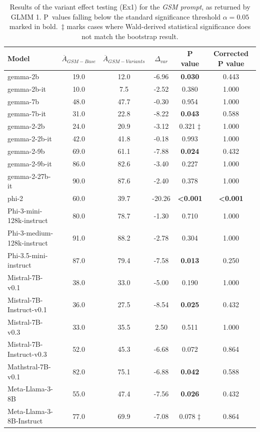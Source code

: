 \documentclass[11pt]{article}
\newcommand{\pbdesc}{P~values falling below the standard significance threshold $\alpha=0.05$ marked in bold.}
\newcommand{\ddagdesc}{$\ddagger$ marks cases where Wald-derived statistical significance does not match the bootstrap result.}
\begin{document}
\begin{table}[H]
\centering
\small
\begin{tabular}{lccccc}
\toprule
Model & $\overline{A}_{GSM-Base}$ & $\overline{A}_{GSM-Variants}$ & $\Delta_{var}$ & P value & Corrected P value \\
\midrule
gemma-2b & 19.0 & 12.0 & -6.96 & \textbf{0.030} & 0.443 \\
gemma-2b-it & 10.0 & 7.5 & -2.52 & 0.380 & 1.000 \\
gemma-7b & 48.0 & 47.7 & -0.30 & 0.954 & 1.000 \\
gemma-7b-it & 31.0 & 22.8 & -8.22 & \textbf{0.043} & 0.588 \\
gemma-2-2b & 24.0 & 20.9 & -3.12 & 0.321 $\ddagger$ & 1.000 \\
gemma-2-2b-it & 42.0 & 41.8 & -0.18 & 0.993 & 1.000 \\
gemma-2-9b & 69.0 & 61.1 & -7.88 & \textbf{0.024} & 0.432 \\
gemma-2-9b-it & 86.0 & 82.6 & -3.40 & 0.227 & 1.000 \\
gemma-2-27b-it & 90.0 & 87.6 & -2.40 & 0.378 & 1.000 \\
phi-2 & 60.0 & 39.7 & -20.26 & \textbf{<0.001} & \textbf{<0.001} \\
Phi-3-mini-128k-instruct & 80.0 & 78.7 & -1.30 & 0.710 & 1.000 \\
Phi-3-medium-128k-instruct & 91.0 & 88.2 & -2.78 & 0.304 & 1.000 \\
Phi-3.5-mini-instruct & 87.0 & 79.4 & -7.58 & \textbf{0.013} & 0.250 \\
Mistral-7B-v0.1 & 38.0 & 33.0 & -5.00 & 0.190 & 1.000 \\
Mistral-7B-Instruct-v0.1 & 36.0 & 27.5 & -8.54 & \textbf{0.025} & 0.432 \\
Mistral-7B-v0.3 & 33.0 & 35.5 & 2.50 & 0.511 & 1.000 \\
Mistral-7B-Instruct-v0.3 & 52.0 & 45.3 & -6.68 & 0.072 & 0.864 \\
Mathstral-7B-v0.1 & 82.0 & 75.1 & -6.88 & \textbf{0.042} & 0.588 \\
Meta-Llama-3-8B & 55.0 & 47.4 & -7.56 & \textbf{0.026} & 0.432 \\
Meta-Llama-3-8B-Instruct & 77.0 & 69.9 & -7.08 & 0.078 $\ddagger$ & 0.864 \\
\bottomrule
\end{tabular}
\caption{Results of the variant effect testing (Ex1) for the \textit{GSM prompt}, as returned by GLMM 1. \pbdesc\ \ddagdesc}
\label{tab:GSM-results}
\end{table}
\end{document}
